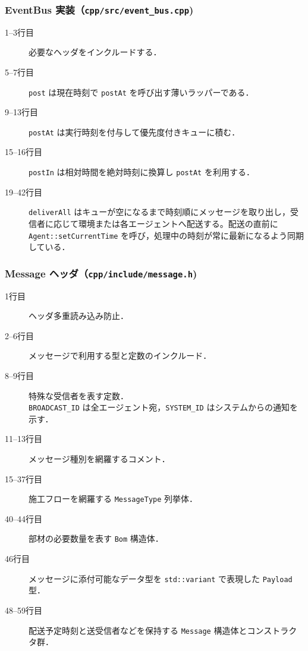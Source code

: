 \documentclass[10pt,letterpaper]{jsarticle}
\begin{document}
\subsubsection{EventBus 実装（\texttt{cpp/src/event\_bus.cpp})}

\begin{description}
  \item[1--3行目] 必要なヘッダをインクルードする．
  \item[5--7行目] \texttt{post} は現在時刻で \texttt{postAt} を呼び出す薄いラッパーである．
  \item[9--13行目] \texttt{postAt} は実行時刻を付与して優先度付きキューに積む．
  \item[15--16行目] \texttt{postIn} は相対時間を絶対時刻に換算し \texttt{postAt} を利用する．
  \item[19--42行目] \texttt{deliverAll} はキューが空になるまで時刻順にメッセージを取り出し，受信者に応じて環境または各エージェントへ配送する。配送の直前に \texttt{Agent::setCurrentTime} を呼び，処理中の時刻が常に最新になるよう同期している．
\end{description}

\subsubsection{Message ヘッダ（\texttt{cpp/include/message.h})}

\begin{description}
  \item[1行目] ヘッダ多重読み込み防止．
  \item[2--6行目] メッセージで利用する型と定数のインクルード．
  \item[8--9行目] 特殊な受信者を表す定数．\\\texttt{BROADCAST\_ID} は全エージェント宛，\texttt{SYSTEM\_ID} はシステムからの通知を示す．
  \item[11--13行目] メッセージ種別を網羅するコメント．
  \item[15--37行目] 施工フローを網羅する \texttt{MessageType} 列挙体．
  \item[40--44行目] 部材の必要数量を表す \texttt{Bom} 構造体．
  \item[46行目] メッセージに添付可能なデータ型を \texttt{std::variant} で表現した \texttt{Payload} 型．
  \item[48--59行目] 配送予定時刻と送受信者などを保持する \texttt{Message} 構造体とコンストラクタ群．
\end{description}
\end{document}
